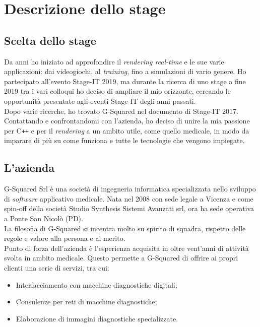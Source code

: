 
\chapter{Descrizione dello stage}
\label{cap:descrizione-stage}
\section{Scelta dello stage}\label{sec:scelta-dello-stage}
Da anni ho iniziato ad approfondire il \emph{rendering real-time} e le sue varie applicazioni: dai videogiochi, al \emph{training}, fino a simulazioni di vario genere.
Ho partecipato all'evento Stage-IT 2019, ma durante la ricerca di uno stage a fine 2019 tra i vari colloqui ho deciso di ampliare il mio orizzonte, cercando le opportunità presentate agli eventi Stage-IT degli anni passati.
\\
Dopo varie ricerche, ho trovato G-Squared nel documento di Stage-IT 2017. Contattando e confrontandomi con l'azienda, ho deciso di unire la mia passione per C\texttt{++} e per il \emph{rendering} a un ambito utile, come quello medicale, in modo da imparare di più su come funziona e tutte le tecnologie che vengono impiegate.

\section{L'azienda}
\label{azienda}
G-Squared Srl è una società di ingegneria informatica specializzata nello sviluppo di \emph{software} applicativo medicale. Nata nel 2008 con sede legale a Vicenza e come spin-off della società Studio Synthesis Sistemi Avanzati srl, ora ha sede operativa a Ponte San Nicolò (PD).
\\
La filosofia di G-Squared si incentra molto su spirito di squadra, rispetto delle regole e valore alla persona e al merito.
\\
Punto di forza dell'azienda è l'esperienza acquisita in oltre vent'anni di attività svolta in ambito medicale. Questo permette a G-Squared di offrire ai propri clienti una serie di servizi, tra cui:
\begin{itemize}
	\item Interfacciamento con macchine diagnostiche digitali;
	\item Consulenze per reti di macchine diagnostiche;
	\item Elaborazione di immagini diagnostiche specializzate.
\end{itemize}

